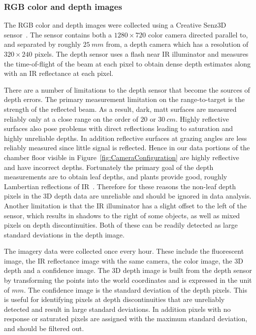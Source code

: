\subsubsection{RGB color and depth images} %

The RGB color and depth images were collected using a Creative Senz3D sensor~\cite{nguyen2015vietnamese}. The sensor contains both a $1280 \times 720$ color camera directed parallel to, and separated by roughly $25~mm$ from, a depth camera which has a resolution of $320\times240$ pixels. 
The depth sensor uses a flash near IR illuminator and measures the time-of-flight of the beam at each pixel to obtain dense depth estimates along with an IR reflectance at each pixel.

There are a number of limitations to the depth sensor that become the sources of depth errors. 
The primary measurement limitation on the range-to-target is the strength of the reflected beam. 
As a result, dark, matt surfaces are measured reliably only at a close range on the order of $20$ or $30~cm$.  
Highly reflective surfaces also pose problems with direct reflections leading to saturation and highly unreliable depths.  
In addition reflective surfaces at grazing angles are less reliably measured since little signal is reflected. 
Hence in our data portions of the chamber floor visible in Figure~\ref{fig:CameraConfiguration} are highly reflective and have incorrect depths.  %
Fortunately the primary goal of the depth measurements are to obtain leaf depths, and plants provide good, roughly Lambertian reflections of IR~\cite{Chelle2006219}.  
Therefore for these reasons the non-leaf depth pixels in the $3$D depth data are unreliable and should be ignored in data analysis.  
Another limitation is that the IR illuminator has a slight offset to the left of the sensor, which results in shadows to the right of some objects, as well as mixed pixels on depth discontinuities.  
Both of these can be readily detected as large standard deviations in the depth image.


The imagery data were collected once every hour. %
These include the fluorescent image, the IR reflectance image with the same camera, the color image, the $3$D depth and a confidence image.  
The $3$D depth image is built from the depth sensor by transforming the points into the world coordinates and is expressed in the unit of $mm$.  
The confidence image is the standard deviation of the depth pixels.  
This is useful for identifying pixels at depth discontinuities that are unreliably detected and result in large standard deviations.  
In addition pixels with no response or saturated pixels are assigned with the maximum standard deviation, and should be filtered out.

